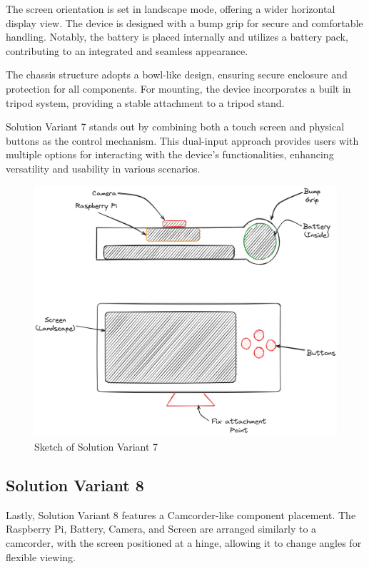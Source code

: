 The screen orientation is set in landscape mode, offering a wider horizontal display view. The device is designed with a bump grip for secure and comfortable handling. Notably, the battery is placed internally and utilizes a battery pack, contributing to an integrated and seamless appearance.

The chassis structure adopts a bowl-like design, ensuring secure enclosure and protection for all components. For mounting, the device incorporates a built in tripod system, providing a stable attachment to a tripod stand.

Solution Variant 7 stands out by combining both a touch screen and physical buttons as the control mechanism. This dual-input approach provides users with multiple options for interacting with the device's functionalities, enhancing versatility and usability in various scenarios.

\begin{figure}[H]
    \centering
    \includegraphics[width=\linewidth]{texs/Part1/chapter3/image/v7.png}
    \caption{Sketch of Solution Variant 7}
    \label{fig:sketch-solution-variant-7}
\end{figure}

\subsection{Solution Variant 8}
Lastly, Solution Variant 8 features a Camcorder-like component placement. The Raspberry Pi, Battery, Camera, and Screen are arranged similarly to a camcorder, with the screen positioned at a hinge, allowing it to change angles for flexible viewing.

